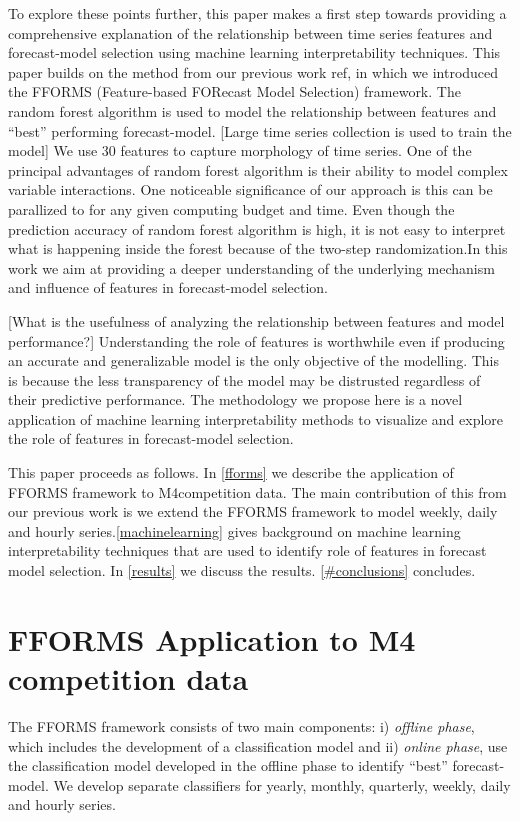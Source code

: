 \documentclass[11pt,a4paper,]{article}
\theoremstyle{definition}
\theoremstyle{definition}
\theoremstyle{definition}
\theoremstyle{remark}
\begin{document}
To explore these points further, this paper makes a first step towards
providing a comprehensive explanation of the relationship between time
series features and forecast-model selection using machine learning
interpretability techniques. This paper builds on the method from our
previous work ref, in which we introduced the FFORMS (Feature-based
FORecast Model Selection) framework. The random forest algorithm is used
to model the relationship between features and ``best'' performing
forecast-model. {[}Large time series collection is used to train the
model{]} We use 30 features to capture morphology of time series. One of
the principal advantages of random forest algorithm is their ability to
model complex variable interactions. One noticeable significance of our
approach is this can be parallized to for any given computing budget and
time. Even though the prediction accuracy of random forest algorithm is
high, it is not easy to interpret what is happening inside the forest
because of the two-step randomization.In this work we aim at providing a
deeper understanding of the underlying mechanism and influence of
features in forecast-model selection.

{[}What is the usefulness of analyzing the relationship between features
and model performance?{]} Understanding the role of features is
worthwhile even if producing an accurate and generalizable model is the
only objective of the modelling. This is because the less transparency
of the model may be distrusted regardless of their predictive
performance. The methodology we propose here is a novel application of
machine learning interpretability methods to visualize and explore the
role of features in forecast-model selection.

This paper proceeds as follows. In \autoref{fforms} we describe the
application of FFORMS framework to M4competition data. The main
contribution of this from our previous work \textcite{fforms} is we
extend the FFORMS framework to model weekly, daily and hourly
series.\autoref{machinelearning} gives background on machine learning
interpretability techniques that are used to identify role of features
in forecast model selection. In \autoref{results} we discuss the
results. \autoref{#conclusions} concludes.

\section{FFORMS Application to M4 competition data}\label{fforms}

The FFORMS framework consists of two main components: i) \emph{offline
phase}, which includes the development of a classification model and ii)
\emph{online phase}, use the classification model developed in the
offline phase to identify ``best'' forecast-model. We develop separate
classifiers for yearly, monthly, quarterly, weekly, daily and hourly
series.
\end{document}
